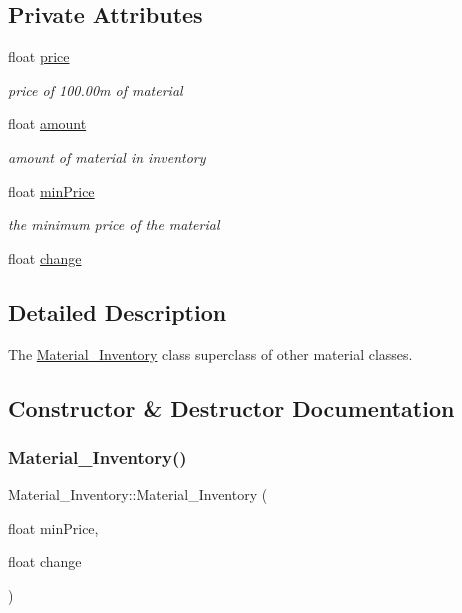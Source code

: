 \subsection*{Private Attributes}
\begin{DoxyCompactItemize}
\item 
float \hyperlink{classMaterial__Inventory_a32622250fa5246e1ee091d3fd8dd72ff}{price}
\begin{DoxyCompactList}\small\item\em price of 100.\+00m of material \end{DoxyCompactList}\item 
float \hyperlink{classMaterial__Inventory_a928c45234f051861431e8adc1bd4f368}{amount}
\begin{DoxyCompactList}\small\item\em amount of material in inventory \end{DoxyCompactList}\item 
float \hyperlink{classMaterial__Inventory_afb28e18e6100fb9ef18c283866759bb3}{min\+Price}
\begin{DoxyCompactList}\small\item\em the minimum price of the material \end{DoxyCompactList}\item 
float \hyperlink{classMaterial__Inventory_a3fbae5816d7f24c3715f8c7d2cc842a6}{change}
\end{DoxyCompactItemize}


\subsection{Detailed Description}
The \hyperlink{classMaterial__Inventory}{Material\+\_\+\+Inventory} class superclass of other material classes. 

\subsection{Constructor \& Destructor Documentation}
\mbox{\label{classMaterial__Inventory_a996e5441abe78653a8cb386a499a4063}} 
\subsubsection{\texorpdfstring{Material\+\_\+\+Inventory()}{Material\_Inventory()}}
{\footnotesize\ttfamily Material\+\_\+\+Inventory\+::\+Material\+\_\+\+Inventory (\begin{DoxyParamCaption}\item[{float}]{min\+Price,  }\item[{float}]{change }\end{DoxyParamCaption})}




